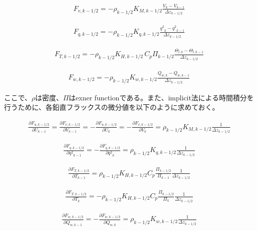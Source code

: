 \begin{eqnarray}F_{v,k-1/2}=-\rho_{k-1/2}K_{M,k-1/2}\frac{V_{k}-V_{k-1}}{\Delta z_{k-1/2}}\end{eqnarray}

\begin{eqnarray}F_{q,k-1/2}=-\rho_{k-1/2}K_{q,k-1/2}\frac{{q^2}_ {k}-{q^2}_ {k-1}}{\Delta z_{k-1/2}}\end{eqnarray}

\begin{eqnarray}F_{T,k-1/2}=-\rho_{k-1/2}K_{H,k-1/2}\,C_p\Pi_{k-1/2}\frac{\Theta_{l,k}-\Theta_{l,k-1}}{\Delta z_{k-1/2}}\end{eqnarray}

\begin{eqnarray}F_{w,k-1/2}=-\rho_{k-1/2}K_{w,k-1/2}\frac{Q_{w,k}-Q_{w,k-1}}{\Delta z_{k-1/2}}\end{eqnarray}

ここで、\(\rho\)は密度、\(\Pi\)はexner functionである。また、implicit法による時間積分を行うために、各鉛直フラックスの微分値を以下のように求めておく。

\begin{eqnarray}\frac{\partial F_{u,k-1/2}}{\partial U_{k-1}}=\frac{\partial F_{v,k-1/2}}{\partial V_{k-1}}=-\frac{\partial F_{u,k-1/2}}{\partial U_{k}}=-\frac{\partial F_{v,k-1/2}}{\partial V_{k}}=\rho_{k-1/2}K_{M,k-1/2}\frac{1}{\Delta z_{k-1/2}}\end{eqnarray}

\begin{eqnarray}\frac{\partial F_{q,k-1/2}}{\partial {q^2}_ {k-1}}=-\frac{\partial F_{q,k-1/2}}{\partial {q^2}_ {k}}=\rho_{k-1/2}K_{q,k-1/2}\frac{1}{\Delta z_{k-1/2}}\end{eqnarray}

\begin{eqnarray}\frac{\partial F_{T,k-1/2}}{\partial T_{k-1}}=\rho_{k-1/2}K_{H,k-1/2}C_p\frac{\Pi_{k-1/2}}{\Pi_{k-1}}\frac{1}{\Delta z_{k-1/2}}\end{eqnarray}

\begin{eqnarray}\frac{\partial F_{T,k-1/2}}{\partial T_{k}}=-\rho_{k-1/2}K_{H,k-1/2}C_p\frac{\Pi_{k-1/2}}{\Pi_{k}}\frac{1}{\Delta z_{k-1/2}}\end{eqnarray}

\begin{eqnarray}\frac{\partial F_{w,k-1/2}}{\partial Q_{w,k-1}}=-\frac{\partial F_{w,k-1/2}}{\partial Q_{w,k}}=\rho_{k-1/2}K_{w,k-1/2}\frac{1}{\Delta z_{k-1/2}}\end{eqnarray}

